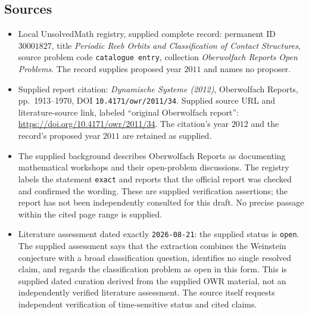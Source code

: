 \documentclass[11pt]{article}
\begin{document}
\subsection{Sources}
\begin{itemize}
\item Local UnsolvedMath registry, supplied complete record: permanent ID \(30001827\), title \emph{Periodic Reeb Orbits and Classification of Contact Structures}, source problem code \texttt{catalogue entry}, collection \emph{Oberwolfach Reports Open Problems}. The record supplies proposed year \(2011\) and names no proposer.
\item Supplied report citation: \emph{Dynamische Systeme (2012)}, Oberwolfach Reports, pp.~1913--1970, DOI \texttt{10.4171/owr/2011/34}. Supplied source URL and literature-source link, labeled ``original Oberwolfach report'': \url{https://doi.org/10.4171/owr/2011/34}. The citation's year \(2012\) and the record's proposed year \(2011\) are retained as supplied.
\item The supplied background describes Oberwolfach Reports as documenting mathematical workshops and their open-problem discussions. The registry labels the statement \texttt{exact} and reports that the official report was checked and confirmed the wording. These are supplied verification assertions; the report has not been independently consulted for this draft. No precise passage within the cited page range is supplied.
\item Literature assessment dated exactly \texttt{2026-08-21}: the supplied status is \texttt{open}. The supplied assessment says that the extraction combines the Weinstein conjecture with a broad classification question, identifies no single resolved claim, and regards the classification problem as open in this form. This is supplied dated curation derived from the supplied OWR material, not an independently verified literature assessment. The source itself requests independent verification of time-sensitive status and cited claims.
\end{itemize}
\end{document}
